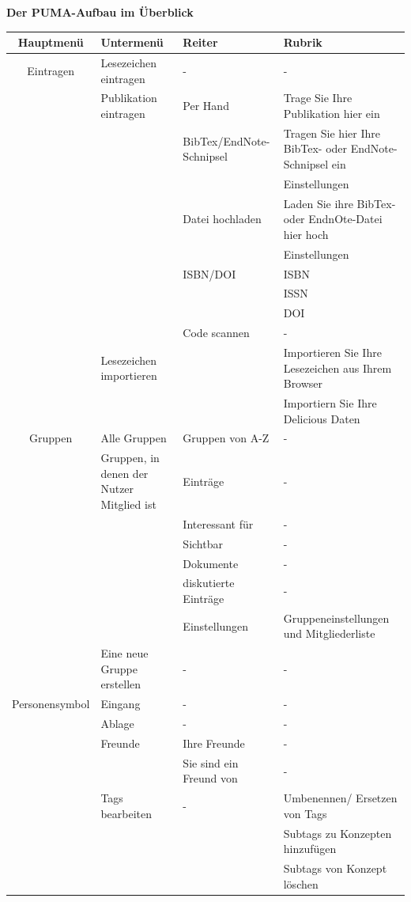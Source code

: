 \textbf{Der PUMA-Aufbau im Überblick}
\small
\begin{longtable}{|c|m{3cm}|m{3cm}|m{3cm}|}\hline 
\bfseries Hauptmenü&\bfseries Untermenü&Reiter &\bfseries Rubrik\\  \hline
Eintragen&Lesezeichen eintragen &- &-\\ \cline{2-4}
&Publikation eintragen &Per Hand& Trage Sie Ihre Publikation hier ein\\\cline{3-4}
&&BibTex/EndNote-Schnipsel& Tragen Sie hier Ihre BibTex- oder EndNote-Schnipsel ein\\ \cline{4-4}
&&& Einstellungen\\ \cline{3-4}
&&Datei hochladen& Laden Sie ihre BibTex- oder EndnOte-Datei hier hoch\\ \cline{4-4}
&&&Einstellungen\\ \cline{3-4}
&&ISBN/DOI& ISBN\\ \cline{4-4}
&&& ISSN \\ \cline{4-4}
&&&DOI\\ \cline{3-4}
&&Code scannen&-\\ \cline{2-4}
&Lesezeichen importieren& &Importieren Sie Ihre Lesezeichen aus Ihrem Browser\\ \cline{4-4}
&& & Importiern Sie Ihre Delicious Daten\\ \hline 
Gruppen&Alle Gruppen& Gruppen von A-Z &-\\ \cline{2-4}
&Gruppen, in denen der Nutzer Mitglied ist& Einträge &-\\\cline{3-4}
&&Interessant für &- \\ \cline{3-4}
&&Sichtbar&-\\ \cline{3-4}
&&Dokumente&-\\ \cline{3-4}
&&diskutierte Einträge&-\\ \cline{3-4}
&&Einstellungen& Gruppeneinstellungen und Mitgliederliste\\ \cline{2-4}
&Eine neue Gruppe erstellen&-&-\\ \hline
Personensymbol&Eingang&-&-\\ \cline{2-4}
&Ablage&-&-\\ \cline{2-4}
&Freunde&Ihre Freunde&- \\ \cline{3-4}
&&Sie sind ein Freund von&- \\ \cline{2-4}
&Tags bearbeiten&-&Umbenennen/ Ersetzen von Tags\\ \cline{4-4}
&&&Subtags zu Konzepten hinzufügen\\ \cline{4-4}
&&&Subtags von Konzept löschen\\ \cline{2-4}

\end{longtable}
